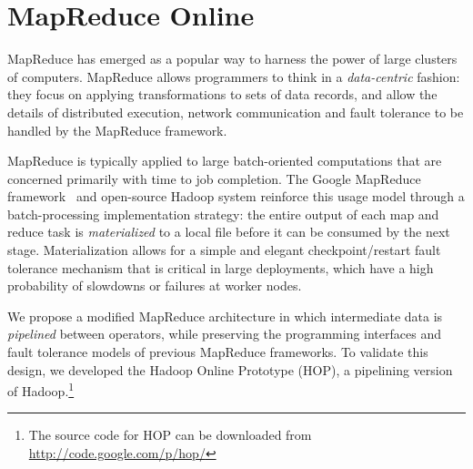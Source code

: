 \chapter[MapReduce Online]{MapReduce Online}
\label{ch:hop}

MapReduce has emerged as a popular way to harness the power of large clusters of
computers. MapReduce allows programmers to think in a \emph{data-centric}
fashion: they focus on applying transformations to sets of data records, and
allow the details of distributed execution, network communication and fault
tolerance to be handled by the MapReduce framework.

MapReduce is typically applied to large batch-oriented computations that are
concerned primarily with time to job completion.  The Google MapReduce
framework~\cite{mapreduce-osdi} and open-source Hadoop system reinforce this
usage model through a batch-processing implementation strategy: the entire
output of each map and reduce task is \emph{materialized} to a local file
before it can be consumed by the next stage.  Materialization allows for a
simple and elegant checkpoint/restart fault tolerance mechanism that is critical
in large deployments, which have a high probability of slowdowns or failures at
worker nodes.

We propose a modified MapReduce architecture in which intermediate data is
\emph{pipelined} between operators, while preserving the programming interfaces
and fault tolerance models of previous MapReduce frameworks. To validate this
design, we developed the Hadoop Online Prototype (HOP), a pipelining version of
Hadoop.\footnote{The source code for HOP can be downloaded from \url{http://code.google.com/p/hop/}}

